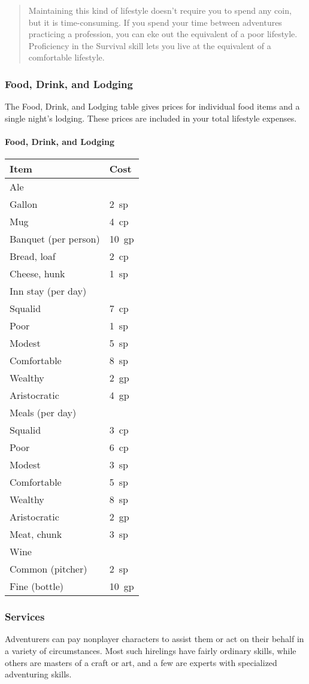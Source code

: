 \documentclass[
]{article}
\begin{document}
\begin{quote}
Maintaining this kind of lifestyle doesn't require you to spend any
coin, but it is time-consuming. If you spend your time between
adventures practicing a profession, you can eke out the equivalent of a
poor lifestyle. Proficiency in the Survival skill lets you live at the
equivalent of a comfortable lifestyle.
\end{quote}

\hypertarget{food-drink-and-lodging}{%
\subsubsection{Food, Drink, and Lodging}\label{food-drink-and-lodging}}

The Food, Drink, and Lodging table gives prices for individual food
items and a single night's lodging. These prices are included in your
total lifestyle expenses.

\hypertarget{food-drink-and-lodging-1}{%
\paragraph{Food, Drink, and Lodging}\label{food-drink-and-lodging-1}}

\begin{longtable}[]{@{}ll@{}}
\toprule
Item & Cost\tabularnewline
\midrule
\endhead
Ale &\tabularnewline
Gallon & 2~sp\tabularnewline
Mug & 4~cp\tabularnewline
Banquet (per person) & 10~gp\tabularnewline
Bread, loaf & 2~cp\tabularnewline
Cheese, hunk & 1~sp\tabularnewline
Inn stay (per day) &\tabularnewline
Squalid & 7~cp\tabularnewline
Poor & 1~sp\tabularnewline
Modest & 5~sp\tabularnewline
Comfortable & 8~sp\tabularnewline
Wealthy & 2~gp\tabularnewline
Aristocratic & 4~gp\tabularnewline
Meals (per day) &\tabularnewline
Squalid & 3~cp\tabularnewline
Poor & 6~cp\tabularnewline
Modest & 3~sp\tabularnewline
Comfortable & 5~sp\tabularnewline
Wealthy & 8~sp\tabularnewline
Aristocratic & 2~gp\tabularnewline
Meat, chunk & 3~sp\tabularnewline
Wine &\tabularnewline
Common (pitcher) & 2~sp\tabularnewline
Fine (bottle) & 10~gp\tabularnewline
\bottomrule
\end{longtable}

\hypertarget{services}{%
\subsubsection{Services}\label{services}}

Adventurers can pay nonplayer characters to assist them or act on their
behalf in a variety of circumstances. Most such hirelings have fairly
ordinary skills, while others are masters of a craft or art, and a few
are experts with specialized adventuring skills.
\end{document}
